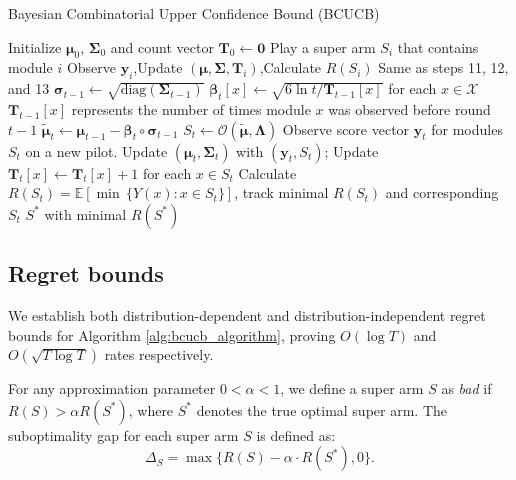 \documentclass[opre,sglanonrev]{informs4}
\begin{document}
\begin{algorithm}
\caption{Bayesian Combinatorial Upper Confidence Bound (BCUCB)}
\label{alg:bcucb_algorithm}
\begin{algorithmic}[1]
\State Initialize $\boldsymbol{\mu}_0$, $\boldsymbol{\Sigma}_0$ and count vector $\mathbf{T}_0 \gets \mathbf{0}$ 
 
	\State Play a super arm $S_i$ that contains module $i$
	\State Observe $\mathbf{y}_i$,Update $(\boldsymbol{\mu}, \boldsymbol{\Sigma},\mathbf{T}_i)$,Calculate $R(S_i)$ \Comment Same as steps 11, 12, and 13
\EndFor
{} 
    \State $\boldsymbol{\sigma}_{t-1} \gets \sqrt{\text{diag}(\boldsymbol{\Sigma}_{t-1})}$ 
    \State $\boldsymbol{\beta}_t[x] \gets \sqrt{6 \ln t / \mathbf{T}_{t-1}[x]}$ for each $x \in \mathcal{X}$ \Comment $\mathbf{T}_{t-1}[x]$ represents the number of times module $x$ was observed before round $t-1$
    \State $\boldsymbol{\tilde{\mu}}_t \gets \boldsymbol{\mu}_{t-1} - \boldsymbol{\beta}_t \circ \boldsymbol{\sigma}_{t-1}$ 
    \State $S_t \gets \mathcal{O}(\boldsymbol{\tilde{\mu}}, \boldsymbol{\Lambda})$ 
    \State Observe score vector $\mathbf{y}_t$ for modules $S_t$ on a new pilot.
    \State Update $(\boldsymbol{\mu}_t, \boldsymbol{\Sigma}_t)$ with $(\mathbf{y}_t, S_t)$; Update $\mathbf{T}_t[x] \gets \mathbf{T}_t[x] + 1$ for each $x \in S_t$
    \State Calculate $R(S_t) = \mathbb{E}[\min\,\{Y(x) : x \in S_t\}]$, track minimal $R(S_t)$ and corresponding $S_t$ 
\EndFor
\State \Return $S^*$ with minimal $R(S^*)$
\end{algorithmic}
\end{algorithm}
\subsection{Regret bounds}
We establish both distribution-dependent and distribution-independent regret bounds for Algorithm \ref{alg:bcucb_algorithm}, proving $O(\log T)$ and $O(\sqrt{T \log T})$ rates respectively.

For any approximation parameter $0 < \alpha < 1$, we define a super arm $S$ as \emph{bad} if $R(S) > \alpha R(S^*)$, where $S^*$ denotes the true optimal super arm. The suboptimality gap for each super arm $S$ is defined as:
$$
\Delta_S = \max\{R(S) - \alpha \cdot R(S^*), 0\}.
$$
\end{document}
